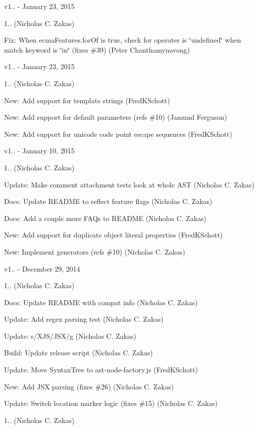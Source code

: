 v1.. -\/ January 23, 2015


\begin{DoxyItemize}
\item 1.. (Nicholas C. Zakas)
\item Fix\+: When ecma\+Features.\+for\+Of is true, check for operater is \char`\"{}undefined\char`\"{} when match keyword is \char`\"{}in\char`\"{} (fixes \#39) (Peter Chanthamynavong)
\end{DoxyItemize}

v1.. -\/ January 23, 2015


\begin{DoxyItemize}
\item 1.. (Nicholas C. Zakas)
\item New\+: Add support for template strings (Fred\+K\+Schott)
\item New\+: Add support for default parameters (refs \#10) (Jamund Ferguson)
\item New\+: Add support for unicode code point escape sequences (Fred\+K\+Schott)
\end{DoxyItemize}

v1.. -\/ January 10, 2015


\begin{DoxyItemize}
\item 1.. (Nicholas C. Zakas)
\item Update\+: Make comment attachment tests look at whole A\+ST (Nicholas C. Zakas)
\item Docs\+: Update R\+E\+A\+D\+ME to reflect feature flags (Nicholas C. Zakas)
\item Docs\+: Add a couple more F\+A\+Qs to R\+E\+A\+D\+ME (Nicholas C. Zakas)
\item New\+: Add support for duplicate object literal properties (Fred\+K\+Schott)
\item New\+: Implement generators (refs \#10) (Nicholas C. Zakas)
\end{DoxyItemize}

v1.. -\/ December 29, 2014


\begin{DoxyItemize}
\item 1.. (Nicholas C. Zakas)
\item Docs\+: Update R\+E\+A\+D\+ME with compat info (Nicholas C. Zakas)
\item Update\+: Add regex parsing test (Nicholas C. Zakas)
\item Update\+: s/\+X\+J\+S/\+J\+S\+X/g (Nicholas C. Zakas)
\item Build\+: Update release script (Nicholas C. Zakas)
\item Update\+: Move Syntax\+Tree to ast-\/node-\/factory.\+js (Fred\+K\+Schott)
\item New\+: Add J\+SX parsing (fixes \#26) (Nicholas C. Zakas)
\item Update\+: Switch location marker logic (fixes \#15) (Nicholas C. Zakas)
\item 1.. (Nicholas C. Zakas)
\end{DoxyItemize}

